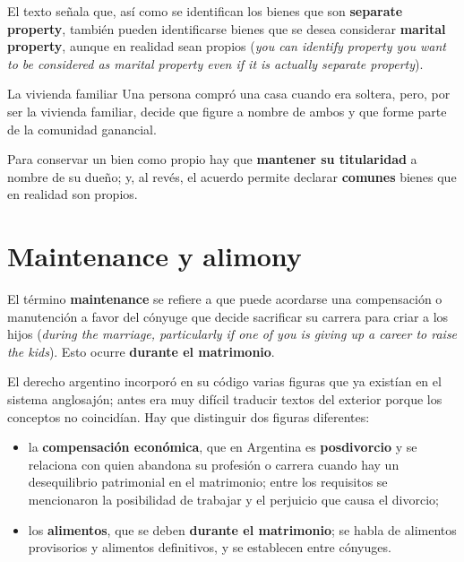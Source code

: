 \documentclass[12pt,oneside]{book}
\begin{document}
El texto señala que, así como se identifican los bienes que son \textbf{separate property}, también pueden identificarse bienes que se desea considerar \textbf{marital property}, aunque en realidad sean propios (\textit{you can identify property you want to be considered as marital property even if it is actually separate property}).

\begin{example}{La vivienda familiar}
Una persona compró una casa cuando era soltera, pero, por ser la vivienda familiar, decide que figure a nombre de ambos y que forme parte de la comunidad ganancial.
\end{example}

\begin{important}
Para conservar un bien como propio hay que \textbf{mantener su titularidad} a nombre de su dueño; y, al revés, el acuerdo permite declarar \textbf{comunes} bienes que en realidad son propios.
\end{important}

\section{Maintenance y alimony}

El término \textbf{maintenance} se refiere a que puede acordarse una compensación o manutención a favor del cónyuge que decide sacrificar su carrera para criar a los hijos (\textit{during the marriage, particularly if one of you is giving up a career to raise the kids}). Esto ocurre \textbf{durante el matrimonio}.

El derecho argentino incorporó en su código varias figuras que ya existían en el sistema anglosajón; antes era muy difícil traducir textos del exterior porque los conceptos no coincidían. Hay que distinguir dos figuras diferentes:

\begin{itemize}
    \item la \textbf{compensación económica}, que en Argentina es \textbf{posdivorcio} y se relaciona con quien abandona su profesión o carrera cuando hay un desequilibrio patrimonial en el matrimonio; entre los requisitos se mencionaron la posibilidad de trabajar y el perjuicio que causa el divorcio;
    \item los \textbf{alimentos}, que se deben \textbf{durante el matrimonio}; se habla de alimentos provisorios y alimentos definitivos, y se establecen entre cónyuges.
\end{itemize}
\end{document}
